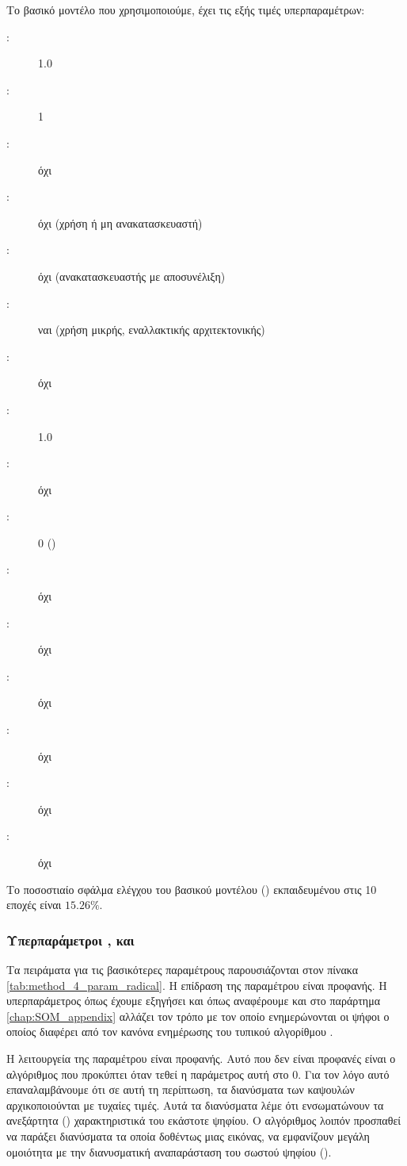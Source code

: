 Το βασικό μοντέλο που χρησιμοποιούμε, έχει τις εξής τιμές υπερπαραμέτρων:
\begin{description}
    \item[:] 1.0
    \item[:] 1
    \item[:] όχι
    \item[:] όχι (χρήση ή μη ανακατασκευαστή)
    \item[:] όχι (ανακατασκευαστής με αποσυνέλιξη)
    \item[:] ναι (χρήση μικρής, εναλλακτικής αρχιτεκτονικής)
    \item[:] όχι
    \item[:] 1.0
    \item[:] όχι
    \item[:] 0 ()
    \item[:] όχι
    \item[:] όχι
    \item[:] όχι
    \item[:] όχι
    \item[:] όχι
    \item[:] όχι        
\end{description}

Το ποσοστιαίο σφάλμα ελέγχου του βασικού μοντέλου () εκπαιδευμένου στις 10 εποχές είναι $15.26\%$.

\subsubsection{Υπερπαράμετροι ,  και }
Τα πειράματα για τις βασικότερες παραμέτρους παρουσιάζονται στον πίνακα \ref{tab:method_4_param_radical}. Η επίδραση της παραμέτρου  είναι προφανής. Η υπερπαράμετρος  όπως έχουμε εξηγήσει και όπως αναφέρουμε και στο παράρτημα \ref{chap:SOM_appendix} αλλάζει τον τρόπο με τον οποίο ενημερώνονται οι ψήφοι ο οποίος διαφέρει από τον κανόνα ενημέρωσης του τυπικού αλγορίθμου .\par

Η λειτουργεία της παραμέτρου  είναι προφανής. Αυτό που δεν είναι προφανές είναι ο αλγόριθμος που προκύπτει όταν τεθεί η παράμετρος αυτή στο 0. Για τον λόγο αυτό επαναλαμβάνουμε ότι σε αυτή τη περίπτωση, τα διανύσματα των καψουλών αρχικοποιούνται με τυχαίες τιμές. Αυτά τα διανύσματα λέμε ότι ενσωματώνουν τα ανεξάρτητα () χαρακτηριστικά του εκάστοτε ψηφίου. Ο αλγόριθμος λοιπόν προσπαθεί να παράξει διανύσματα τα οποία δοθέντως μιας εικόνας, να εμφανίζουν μεγάλη ομοιότητα με την διανυσματική αναπαράσταση του σωστού ψηφίου ().\par

